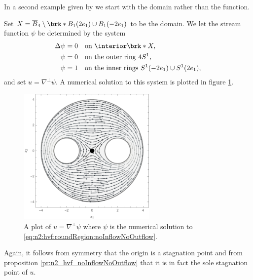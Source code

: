 In a second example given by \cite{Wahlen2023} we start with the domain rather than the function.
\begin{example}
Set $X=\overline{B}_4\setminus\brk*{B_1(2e_1)\cup B_1(-2e_1)}$ to be the domain.
  We let the stream function $\psi$ be determined by the system
  \begin{equation}
    \begin{aligned}
      \Delta \psi&=0 &&\text{on }\openX, \\
      \psi&=0 &&\text{on the outer ring }4S^1, \\
      \psi&=1 &&\text{on the inner rings }S^1(-2e_1)\cup S^1(2e_1),
    \end{aligned}\label{eq:n2:hvf:roundRegion:noInflowNoOutflow}
  \end{equation}
  and set $u=\nabla^\perp\psi$.
  A numerical solution to this system is plotted in figure \ref{pl:n2_hvf_roundRegion_noInflowNoOutflow}.
  \begin{figure}
    \centering
    \includegraphics[width=0.6\textwidth]{../Plots/n2_hvf_roundRegion_noInflowNoOutflow_gray_2.pdf}
    \caption{A plot of $u=\nabla^\perp\psi$ where $\psi$ is the numerical solution to
    \eqref{eq:n2:hvf:roundRegion:noInflowNoOutflow}.}
    \label{pl:n2_hvf_roundRegion_noInflowNoOutflow}
  \end{figure}
  Again, it follows from symmetry that the origin is a stagnation point and
  from proposition \ref{pr:n2_hvf_noInflowNoOutflow} that it is in fact the sole stagnation point of $u$.
\end{example}

